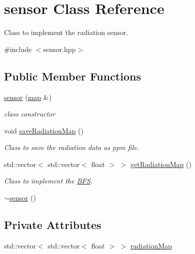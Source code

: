 \hypertarget{classsensor}{}\section{sensor Class Reference}
\label{classsensor}


Class to implement the radiation sensor.  




{\ttfamily \#include $<$sensor.\+hpp$>$}

\subsection*{Public Member Functions}
\begin{DoxyCompactItemize}
\item 
\hyperlink{classsensor_af1db958929faf6e927e2eca5b05c3b40}{sensor} (\hyperlink{classmap}{map} \&)
\begin{DoxyCompactList}\small\item\em class constructor \end{DoxyCompactList}\item 
void \hyperlink{classsensor_aa7aac0b5dca04e72e9334457a3cbd498}{save\+Radiation\+Map} ()
\begin{DoxyCompactList}\small\item\em Class to save the radiation data as ppm file. \end{DoxyCompactList}\item 
std\+::vector$<$ std\+::vector$<$ float $>$ $>$ \hyperlink{classsensor_af13c7b147a19c868375b44199ab9760e}{get\+Radiation\+Map} ()
\begin{DoxyCompactList}\small\item\em Class to implement the \hyperlink{classBFS}{B\+FS}. \end{DoxyCompactList}\item 
\hyperlink{classsensor_a9252346748c0bd090109ee5bcf45f13a}{$\sim$sensor} ()
\end{DoxyCompactItemize}
\subsection*{Private Attributes}
\begin{DoxyCompactItemize}
\item 
std\+::vector$<$ std\+::vector$<$ float $>$ $>$ \hyperlink{classsensor_a20a26da767dcc2547c02e56dc969e549}{radiation\+Map}
\end{DoxyCompactItemize}


